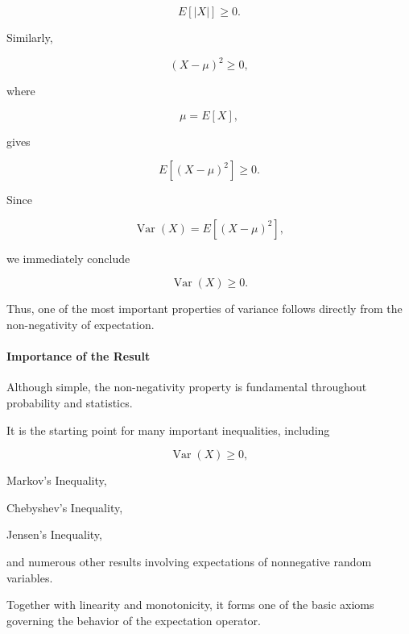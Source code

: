 \documentclass[11pt]{article}
\begin{document}
\begin{mdframed}[
		linewidth=0.8pt,
		roundcorner=6pt,
		backgroundcolor=gray!5,
		linecolor=gray!60,
		innertopmargin=10pt,
		innerbottommargin=10pt,
		innerleftmargin=10pt,
		innerrightmargin=10pt
		]
		\[
		\boxed{
			E[|X|]\ge0.
		}
		\]
		
		Similarly,
		
		\[
		(X-\mu)^2\ge0,
		\]
		
		where
		
		\[
		\mu=E[X],
		\]
		
		gives
		
		\[
		E[(X-\mu)^2]\ge0.
		\]
		
		Since
		
		\[
		\operatorname{Var}(X)
		=
		E[(X-\mu)^2],
		\]
		
		we immediately conclude
		
		\[
		\boxed{
			\operatorname{Var}(X)\ge0.
		}
		\]
		
		Thus, one of the most important properties of variance follows directly from
		the non-negativity of expectation.
		
		\bigskip
		
		\paragraph{Importance of the Result}
		
		Although simple, the non-negativity property is fundamental throughout
		probability and statistics.
		
		It is the starting point for many important inequalities, including
		
		\[
		\operatorname{Var}(X)\ge0,
		\]
		
		Markov's Inequality,
		
		Chebyshev's Inequality,
		
		Jensen's Inequality,
		
		and numerous other results involving expectations of nonnegative random
		variables.
		
		Together with linearity and monotonicity, it forms one of the basic axioms
		governing the behavior of the expectation operator.
		
	\end{mdframed}
	
\end{document}

